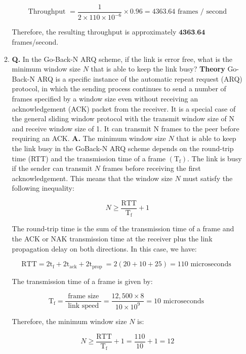 \documentclass[main.tex]{subfiles}
\begin{document}
\begin{enumerate}
\begin{enumerate}
        $$
        \text { Throughput }=\frac{1}{2 \times 110 \times 10^{-6}} \times 0.96=4363.64 \text { frames } / \text { second }
        $$
        
        Therefore, the resulting throughput is approximately $\mathbf{4 3 6 3 . 6 4}$ frames/second.
        
        \item \textbf{Q.}  In the Go-Back-N ARQ scheme, if the link is error free, what is the minimum window size $N$ that is able to keep the link busy? \textbf{Theory} Go-Back-N ARQ is a specific instance of the automatic repeat request (ARQ) protocol, in which the sending process continues to send a number of frames specified by a window size even without receiving an acknowledgement (ACK) packet from the receiver. It is a special case of the general sliding window protocol with the transmit window size of N and receive window size of 1. It can transmit N frames to the peer before requiring an ACK. \textbf{A.} The minimum window size $N$ that is able to keep the link busy in the GoBack-N ARQ scheme depends on the round-trip time (RTT) and the transmission time of a frame $\left(\mathrm{T}_{\mathrm{f}}\right)$. The link is busy if the sender can transmit $N$ frames before receiving the first acknowledgement. This means that the window size $N$ must satisfy the following inequality:
        
        $$
        N \geq \frac{\mathrm{RTT}}{\mathrm{T}_{\mathrm{f}}}+1
        $$
        
        The round-trip time is the sum of the transmission time of a frame and the ACK or NAK transmission time at the receiver plus the link propagation delay on both directions. In this case, we have:
        
        $$
        \mathrm{RTT}=2 \mathrm{t}_{\mathrm{f}}+2 \mathrm{t}_{\mathrm{ack}}+2 \mathrm{t}_{\text {prop }}=2(20+10+25)=110 \text { microseconds }
        $$
        
        The transmission time of a frame is given by:
        
        $$
        \mathrm{T}_{\mathrm{f}}=\frac{\text { frame size }}{\text { link speed }}=\frac{12,500 \times 8}{10 \times 10^9}=10 \text { microseconds }
        $$
        
        Therefore, the minimum window size $N$ is:
        
        $$
        N \geq \frac{\mathrm{RTT}}{\mathrm{T}_{\mathrm{f}}}+1=\frac{110}{10}+1=12
        $$
        

\end{enumerate}
\end{enumerate}
\end{document}
